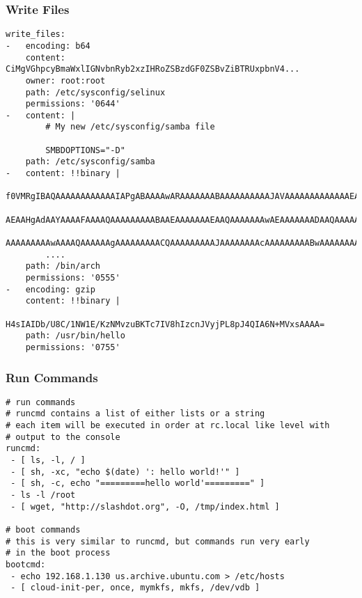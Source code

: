 
\begin{frame}[fragile]
  \frametitle{Write Files}

  \begin{Sbox}
  \tiny
  \begin{minipage}{\linewidth-2\fboxsep-2\fboxrule-4pt}
  \color{white}
  \begin{verbatim}
write_files:
-   encoding: b64
    content: CiMgVGhpcyBmaWxlIGNvbnRyb2xzIHRoZSBzdGF0ZSBvZiBTRUxpbnV4...
    owner: root:root
    path: /etc/sysconfig/selinux
    permissions: '0644'
-   content: |
        # My new /etc/sysconfig/samba file

        SMBDOPTIONS="-D"
    path: /etc/sysconfig/samba
-   content: !!binary |
        f0VMRgIBAQAAAAAAAAAAAAIAPgABAAAAwARAAAAAAABAAAAAAAAAAJAVAAAAAAAAAAAAAEAAOAAI
        AEAAHgAdAAYAAAAFAAAAQAAAAAAAAABAAEAAAAAAAEAAQAAAAAAAwAEAAAAAAADAAQAAAAAAAAgA
        AAAAAAAAAwAAAAQAAAAAAgAAAAAAAAACQAAAAAAAAAJAAAAAAAAcAAAAAAAAABwAAAAAAAAAAQAA
        ....
    path: /bin/arch
    permissions: '0555'
-   encoding: gzip
    content: !!binary |
        H4sIAIDb/U8C/1NW1E/KzNMvzuBKTc7IV8hIzcnJVyjPL8pJ4QIA6N+MVxsAAAA=
    path: /usr/bin/hello
    permissions: '0755'
  \end{verbatim}
  \end{minipage}
  \end{Sbox}

\end{frame}


\begin{frame}[fragile]
  \frametitle{Run Commands}

  \begin{Sbox}
  \Fontsmaller
  \begin{minipage}{\linewidth-2\fboxsep-2\fboxrule-4pt}
  \color{white}
  \begin{verbatim}
# run commands
# runcmd contains a list of either lists or a string
# each item will be executed in order at rc.local like level with
# output to the console
runcmd:
 - [ ls, -l, / ]
 - [ sh, -xc, "echo $(date) ': hello world!'" ]
 - [ sh, -c, echo "=========hello world'=========" ]
 - ls -l /root
 - [ wget, "http://slashdot.org", -O, /tmp/index.html ]

# boot commands
# this is very similar to runcmd, but commands run very early
# in the boot process 
bootcmd:
 - echo 192.168.1.130 us.archive.ubuntu.com > /etc/hosts
 - [ cloud-init-per, once, mymkfs, mkfs, /dev/vdb ]
  \end{verbatim}
  \end{minipage}
  \end{Sbox}

\end{frame}

